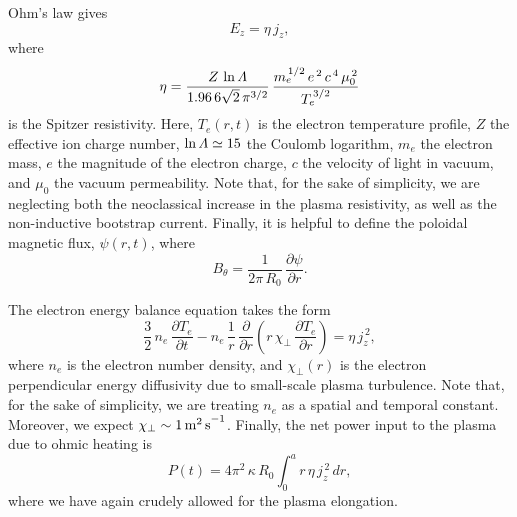 \documentclass[12pt,prb,aps]{revtex4-1}
\begin{document}
Ohm's law gives
\begin{equation}
E_z = \eta\,j_z,
\end{equation}
where
\begin{equation}
\eta = \frac{Z\,\ln{\mit\Lambda}}{1.96\,6\sqrt{2}\,\pi^{3/2}}\,\frac{m_e^{\,1/2}\,e^{\,2}\,c^{\,4}\,\mu_0^{\,2}}{T_e^{\,3/2}}
\end{equation}
is the Spitzer resistivity.\cite{spitzer,fitz} Here, $T_e(r,t)$ is the electron temperature profile, $Z$ the effective ion charge number, $\ln{\mit\Lambda}\simeq 15$ the
Coulomb logarithm, $m_e$ the electron mass, $e$ the magnitude of the electron charge, $c$ the velocity of light in vacuum, and
$\mu_0$ the vacuum permeability. Note that, for the sake of simplicity, we are neglecting both the neoclassical increase in the plasma resistivity, as well as 
the non-inductive bootstrap current.\cite{fitz1} Finally, it is helpful to define the poloidal magnetic flux, $\psi(r,t)$, where 
\begin{equation}
B_\theta =  \frac{1}{2\pi\,R_0}\,\frac{\partial\psi}{\partial r}.
\end{equation}

The electron energy balance equation takes the form\,\cite{fitz}
\begin{equation}
\frac{3}{2}\,n_e\,\frac{\partial T_e}{\partial t} - n_e\,\frac{1}{r}\,\frac{\partial}{\partial r}\left(r\,\chi_\perp\,\frac{\partial T_e}{\partial r}\right)
 = \eta\,j_z^{\,2},
 \end{equation}
 where $n_e$ is the electron number density, and $\chi_\perp(r)$ is the electron perpendicular energy diffusivity due to small-scale plasma turbulence. 
 Note that, for the sake of simplicity, we are treating $n_e$ as a spatial and temporal constant. Moreover, we expect $\chi_\perp \sim 1\,{\rm m^2\,s}^{-1}$.\cite{book}
 Finally, the net power input to the plasma due to ohmic heating is
 \begin{equation}
 P(t) = 4\pi^2\,\kappa\,R_0\int_0^a r\,\eta\,j_z^{\,2}\,dr,
 \end{equation}
 where we have again crudely allowed for the plasma elongation. 
 
\end{document}
